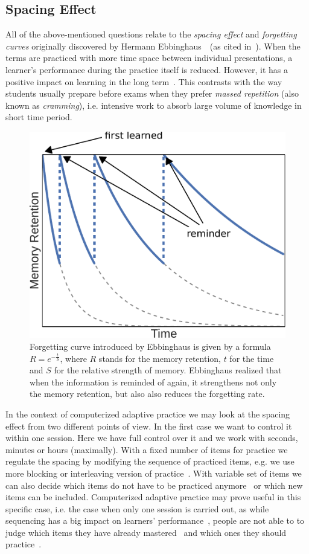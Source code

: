 \documentclass[table,color,cover,twoside,nolot,nolof]{fithesis3/fithesis3}
\begin{document}
\subsection{Spacing Effect}
\label{section:spacing_effect}
All of the above-mentioned questions relate to the \emph{spacing
effect} and \emph{forgetting curves} originally discovered by Hermann
Ebbinghaus~\cite{ebbinghaus1885spacing}~(as cited
in~\cite{pavlik2005practice}). When the terms are practiced with more time
space between individual presentations, a learner's performance during the
practice itself is reduced. However, it has a positive impact on
learning in the long term~\cite{maass2015how, kornell2009optimising}. This
contrasts with the way students usually prepare before exams when they prefer
\emph{massed repetition} (also known as \emph{cramming}), i.e. intensive work
to absorb large volume of knowledge in short time period.

\begin{figure}
	\begin{center}
		\includegraphics[width=.6\textwidth]{figure/forgetting_curves}
		\caption{Forgetting curve introduced by Ebbinghaus is given by a
			formula $R = e^{-\frac{t}{S}}$, where $R$ stands for the memory retention, $t$
			for the time and $S$ for the relative strength of memory. Ebbinghaus
			realized that when the information is reminded of again, it strengthens not
			only the memory retention, but also also reduces the forgetting rate.}
	\end{center}
\end{figure}

In the context of computerized adaptive practice we may look at the spacing
effect from two different points of view. In the first case we want to control
it within one session. Here we have full control over it and we work with
seconds, minutes or hours (maximally). With a fixed number of items for
practice we regulate the spacing by modifying the sequence of practiced items,
e.g. we use more blocking or interleaving version of
practice~\cite{ostrow2015blocking}. With variable set of items we can also
decide which items do not have to be practiced
anymore~\cite{kornell2008optimising} or which new items can be included.
Computerized adaptive practice may prove useful in this specific case, i.e. the
case when only one session is carried out, as while sequencing has a big
impact on learners' performance~\cite{ostrow2015blocking}, people are not able to
to judge which items they have already mastered~\cite{kornell2008optimising}
and which ones they should practice~\cite{kornell2014focusing}.
\end{document}
